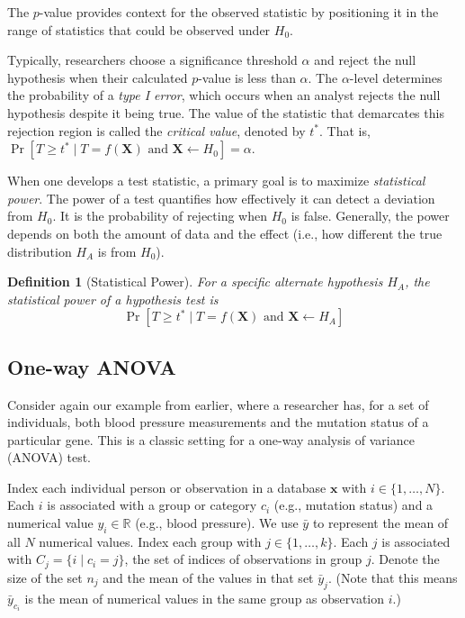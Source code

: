 \documentclass[USenglish,oneside]{article}
\newcounter{ag}
\newcounter{ab}
\newcounter{ar}
\newtheorem{definition}{Definition}
\newcommand{\crit}{\ensuremath{t^*}\xspace}
\newcommand{\x}{\ensuremath{\mathbf{x}}\xspace}
\newcommand{\X}{\ensuremath{\mathbf{X}}\xspace}
\begin{document}
The $p$-value provides context for the observed statistic by positioning it in the range of statistics that could be observed under $H_0$.

Typically, researchers choose a significance threshold $\alpha$ and reject the null hypothesis when their calculated $p$-value is less than $\alpha$. The $\alpha$-level determines the probability of a \textit{type I error}, which occurs when an analyst rejects the null hypothesis despite it being true. The value of the statistic that demarcates this rejection region is called the \emph{critical value}, denoted by \crit. That is, $\Pr[T\geq \crit \mid T = f(\X) \text{ and } \X \leftarrow H_0] = \alpha$.

When one develops a test statistic, a primary goal is to maximize \textit{statistical power}. The power of a test quantifies how effectively it can detect a deviation from $H_0$. It is the probability of rejecting when $H_0$ is false.  Generally, the power depends on both the amount of data and the effect (i.e., how different the true distribution $H_A$ is from $H_0$).

\begin{definition}[Statistical Power] \label{def:power}
For a specific alternate hypothesis $H_A$, the statistical power of a hypothesis test is 
\begin{equation*}
\Pr[T \geq \crit \mid T = f(\X) \text{ and } \X \leftarrow H_A]
\end{equation*}
\end{definition}




\subsection{One-way ANOVA}

Consider again our example from earlier, where a researcher has, for a set of individuals, both blood pressure measurements and the mutation status of a particular gene.  This is a classic setting for a one-way analysis of variance (ANOVA) test.

Index each individual person or observation in a database $\x$ with $i \in \{1, \ldots, N\}$. Each $i$ is associated with a group or category $c_i$ (e.g., mutation status) and a numerical value $y_i \in \mathbb{R}$ (e.g., blood pressure).  We use $\bar{y}$ to represent the mean of all $N$ numerical values. Index each group with $j \in \{1, \ldots, k\}$. Each $j$ is associated with $C_j = \{i \mid c_i=j\}$, the set of indices of observations in group $j$. Denote the size of the set $n_j$ and the mean of the values in that set $\bar{y}_j$.  (Note that this means $\bar{y}_{c_i}$ is the mean of numerical values in the same group as observation $i$.)
\end{document}
